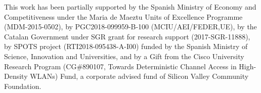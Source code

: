 \documentclass[comsoc]{IEEEtran}
\begin{document}
	This  work  has  been  partially  supported  by  the  Spanish Ministry of Economy and Competitiveness under the Maria de Maeztu  Units  of  Excellence  Programme  (MDM-2015-0502), by PGC2018-099959-B-100 (MCIU/AEI/FEDER,UE), by the Catalan Government under SGR grant for research support (2017-SGR-11888), by SPOTS project (RTI2018-095438-A-I00) funded by the Spanish Ministry of Science, Innovation and Universities, and  by a Gift from the Cisco University Research Program (CG\#890107, Towards Deterministic Channel Access in High-Density WLANs) Fund, a corporate advised fund of Silicon Valley Community Foundation.
	
	\ifCLASSOPTIONcaptionsoff
	\newpage
	\fi
	
	
	
	
	
	
	
	
\end{document}
